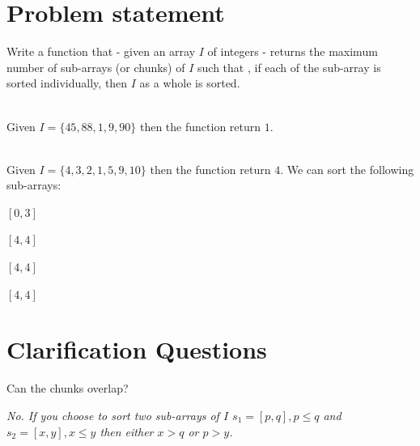 \section{Problem statement}
\begin{exercise}
\label{example:max_num_chunks_sorted:exercice1}
Write a function that  - given an array $I$ of integers  - returns the maximum number of sub-arrays (or chunks) of $I$ 
such that , if each of the sub-array is sorted individually, then $I$ as a whole is sorted.

    \begin{example}
        \label{example:max_num_chunks_sorted:example1}
        \hfill \\
        Given $I=\{45,88,1,9,90\}$ then the function return $1$.
        
    \end{example}

    \begin{example}
        \label{example:max_num_chunks_sorted:example2}
        \hfill \\
        Given $I=\{4,3,2,1,5,9,10\}$ then the function return $4$. We can sort the following sub-arrays:
        \begin{itemize*}
            \item $[0,3]$
            \item $[4,4]$
            \item $[4,4]$
            \item $[4,4]$
        \end{itemize*}
    \end{example}
\end{exercise}

\section{Clarification Questions}

\begin{QandA}
    \begin{questionitem} \begin{question} Can the chunks overlap?   \end{question}      
    \begin{answered}
        \textit{No. If you choose to sort two sub-arrays of $I$ $s_1=[p,q], p\leq q$ and $s_2=[x,y], x\leq y$ then either $x > q$ or $p>y$.}
    \end{answered} \end{questionitem}
    
\end{QandA}

